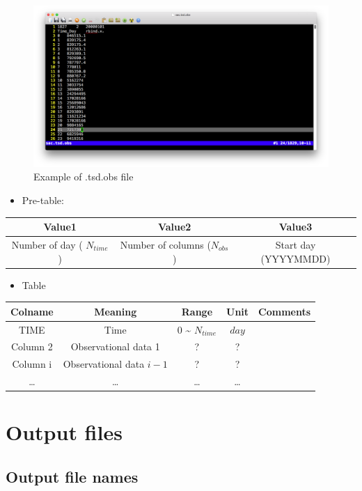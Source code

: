 \documentclass[
]{scrbook}
\providecommand{\tightlist}{%
  \setlength{\itemsep}{0pt}\setlength{\parskip}{0pt}}
\begin{document}
\begin{figure}
\centering
\includegraphics{Fig/IO/tsd.obs.png}
\caption{Example of .tsd.obs file}
\end{figure}

\begin{itemize}
\tightlist
\item
  Pre-table:
\end{itemize}

\begin{longtable}[]{@{}ccc@{}}
\toprule
Value1 & Value2 & Value3\tabularnewline
\midrule
\endhead
Number of day ( \(N_{time}\)) & Number of columns (\(N_{obs}\)) & Start day (YYYYMMDD)\tabularnewline
\bottomrule
\end{longtable}

\begin{itemize}
\tightlist
\item
  Table
\end{itemize}

\begin{longtable}[]{@{}ccccc@{}}
\toprule
Colname & Meaning & Range & Unit & Comments\tabularnewline
\midrule
\endhead
TIME & Time & 0 \textasciitilde{} \(N_{time}\) & \(day\) &\tabularnewline
Column 2 & Observational data 1 & ? & ? &\tabularnewline
Column i & Observational data \(i-1\) & ? & ? &\tabularnewline
\ldots{} & \ldots{} & \ldots{} & \ldots{} &\tabularnewline
\bottomrule
\end{longtable}

\hypertarget{output-files}{%
\chapter{Output files}\label{output-files}}

\hypertarget{output-file-names}{%
\section{Output file names}\label{output-file-names}}
\end{document}
